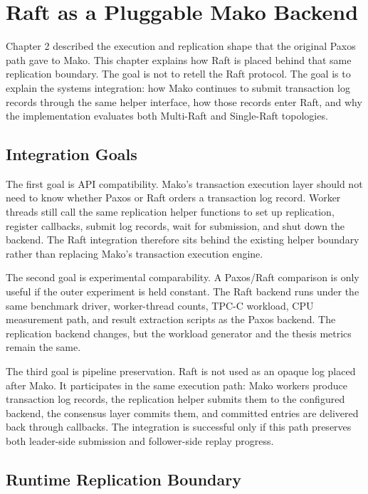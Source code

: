 \chapter{Raft as a Pluggable Mako Backend}

Chapter 2 described the execution and replication shape that the original
Paxos path gave to Mako. This chapter explains how Raft is placed behind that
same replication boundary. The goal is not to retell the Raft protocol. The
goal is to explain the systems integration: how Mako continues to submit
transaction log records through the same helper interface, how those records
enter Raft, and why the implementation evaluates both Multi-Raft and
Single-Raft topologies.

\section{Integration Goals}

The first goal is API compatibility. Mako's transaction execution layer should
not need to know whether Paxos or Raft orders a transaction log record. Worker
threads still call the same replication helper functions to set up replication,
register callbacks, submit log records, wait for submission, and shut down the
backend. The Raft integration therefore sits behind the existing helper
boundary rather than replacing Mako's transaction execution engine.

The second goal is experimental comparability. A Paxos/Raft comparison is only
useful if the outer experiment is held constant. The Raft backend runs under
the same benchmark driver, worker-thread counts, TPC-C workload, CPU
measurement path, and result extraction scripts as the Paxos backend. The
replication backend changes, but the workload generator and the thesis metrics
remain the same.

The third goal is pipeline preservation. Raft is not used as an opaque log
placed after Mako. It participates in the same execution path: Mako workers
produce transaction log records, the replication helper submits them to the
configured backend, the consensus layer commits them, and committed entries
are delivered back through callbacks. The integration is successful only if
this path preserves both leader-side submission and follower-side replay
progress.

\section{Runtime Replication Boundary}

